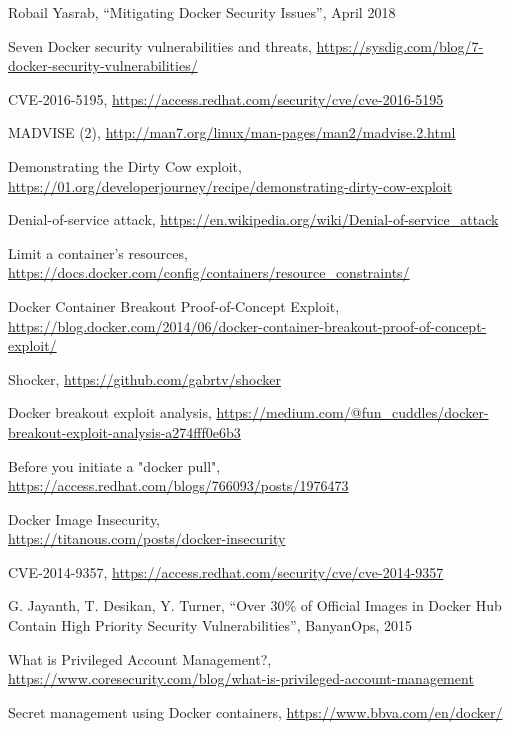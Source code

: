 \documentclass[a4paper,12pt]{article}
\begin{document}
\begin{thebibliography}{99}
Robail Yasrab, ``Mitigating Docker Security Issues'', April 2018

Seven Docker security vulnerabilities and threats,
\url{https://sysdig.com/blog/7-docker-security-vulnerabilities/}

CVE-2016-5195, \url{https://access.redhat.com/security/cve/cve-2016-5195} 

MADVISE (2), \url{http://man7.org/linux/man-pages/man2/madvise.2.html}

Demonstrating the Dirty Cow exploit,
\url{https://01.org/developerjourney/recipe/demonstrating-dirty-cow-exploit}

Denial-of-service attack,
\url{https://en.wikipedia.org/wiki/Denial-of-service_attack}

Limit a container's resources,
\url{https://docs.docker.com/config/containers/resource_constraints/}

Docker Container Breakout Proof-of-Concept Exploit,
\url{https://blog.docker.com/2014/06/docker-container-breakout-proof-of-concept-exploit/}

Shocker, \url{https://github.com/gabrtv/shocker}

Docker breakout exploit analysis,
\url{https://medium.com/@fun_cuddles/docker-breakout-exploit-analysis-a274fff0e6b3}

Before you initiate a "docker pull",
\url{https://access.redhat.com/blogs/766093/posts/1976473}

Docker Image Insecurity, \\ \url{https://titanous.com/posts/docker-insecurity}

CVE-2014-9357, \url{https://access.redhat.com/security/cve/cve-2014-9357}

G. Jayanth, T. Desikan, Y. Turner, ``Over 30\% of Official Images in Docker Hub
Contain High Priority Security Vulnerabilities'', BanyanOps, 2015

What is Privileged Account Management?,
\url{https://www.coresecurity.com/blog/what-is-privileged-account-management}

Secret management using Docker containers, \url{https://www.bbva.com/en/docker/}


\end{thebibliography}
\end{document}

